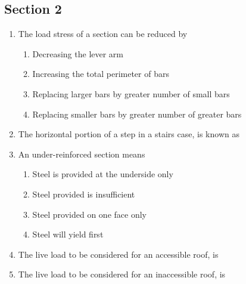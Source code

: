 \documentclass[11pt,a4paper]{article}
\begin{document}
\subsection*{Section 2}
\begin{enumerate}
\item{The load stress of a section can be reduced by}
\begin{enumerate}[label=\Alph*.]
\item{Decreasing the lever arm}
\item{Increasing the total perimeter of bars}
\item{Replacing larger bars by greater number of small bars}
\item{Replacing smaller bars by greater number of greater bars}
\end{enumerate}
\item{The horizontal portion of a step in a stairs case, is known as}
\\
\item{An under-reinforced section means}
\begin{enumerate}[label=\Alph*.]
\item{Steel is provided at the underside only}
\item{Steel provided is insufficient}
\item{Steel provided on one face only}
\item{Steel will yield first}
\end{enumerate}
\item{The live load to be considered for an accessible roof, is}
\\
\item{The live load to be considered for an inaccessible roof, is}
\\\begin{enumerate*}[itemjoin=\qquad, label=\Alph*.]

\end{enumerate*}
\end{enumerate}
\end{document}
